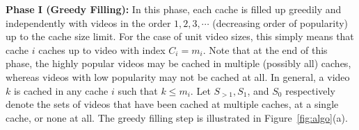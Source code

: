 \documentclass[conference]{IEEEtran}
\begin{document}
\noindent \textbf{Phase I (Greedy Filling):} In this phase, each cache is filled up greedily and independently with videos in the order $1, 2, 3, \cdots$ (decreasing order of popularity) up to the cache size limit. For the case of unit video sizes, this simply means that cache $i$ caches up to video with index $C_i = m_i$. Note that at the end of this phase, the highly popular videos may be cached in multiple (possibly all) caches, whereas videos with low popularity may not be cached at all. In general, a video $k$ is cached in any cache $i$ such that $k \leq m_i$.
Let $S_{>1}, S_1$, and $S_0$ respectively denote the sets of videos that have been cached at multiple caches, at a single cache, or none at all. 
The greedy filling step is illustrated in Figure~\ref{fig:algo}(a). 
\end{document}
